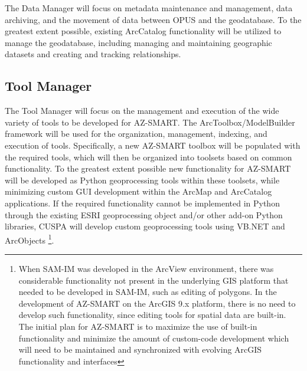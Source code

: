 The Data Manager will focus on metadata maintenance and management,
data archiving, and the movement of data between OPUS and the geodatabase.
To the greatest extent possible, existing ArcCatalog functionality will
be utilized to manage the geodatabase, including managing and maintaining
geographic datasets and creating and tracking relationships.


\subsection{Tool Manager}

The Tool Manager will focus on the management and execution of the wide
variety of tools to be developed for AZ-SMART.  The ArcToolbox/ModelBuilder
framework will be used for the organization, management, indexing, and
execution of tools.  Specifically, a new AZ-SMART toolbox will be populated
with the required tools, which will then be organized into toolsets based
on common functionality.  To the greatest extent possible new
functionality for AZ-SMART will be developed as Python geoprocessing tools
within these toolsets, while minimizing custom GUI development within
the ArcMap and ArcCatalog applications.  If the required functionality
cannot be implemented in Python through the existing ESRI geoprocessing
object and/or other add-on Python libraries, CUSPA will develop custom
geoprocessing tools using VB.NET and ArcObjects \footnote{When SAM-IM was 
developed in the ArcView environment, there was
considerable functionality not present in the underlying GIS
platform that needed to be developed in SAM-IM, such as editing of
polygons.  In the development of AZ-SMART on the ArcGIS 9.x
platform, there is no need to develop such functionality, since
editing tools for spatial data are built-in.  The initial plan for
AZ-SMART is to maximize the use of built-in functionality and
minimize the amount of custom-code development which will need to be
maintained and synchronized with evolving ArcGIS functionality and
interfaces}.


